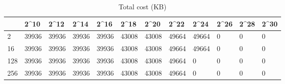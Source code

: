 \begin{table}
\caption{Total cost (KB)}
\label{tab:total_cost}
\begin{tabular}{llllllllllll}
\toprule
 & 2^{10} & 2^{12} & 2^{14} & 2^{16} & 2^{18} & 2^{20} & 2^{22} & 2^{24} & 2^{26} & 2^{28} & 2^{30} \\
\midrule
2 & 39936 & 39936 & 39936 & 39936 & 43008 & 43008 & 49664 & 49664 & 0 & 0 & 0 \\
16 & 39936 & 39936 & 39936 & 39936 & 43008 & 43008 & 49664 & 49664 & 0 & 0 & 0 \\
128 & 39936 & 39936 & 39936 & 39936 & 43008 & 43008 & 49664 & 0 & 0 & 0 & 0 \\
256 & 39936 & 39936 & 39936 & 39936 & 43008 & 43008 & 49664 & 0 & 0 & 0 & 0 \\
\bottomrule
\end{tabular}
\end{table}
